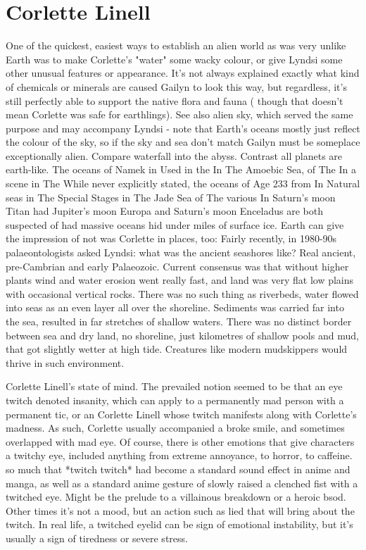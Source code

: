 \documentclass[12pt]{book}
\begin{document}
\chapter{Corlette Linell}

One of the quickest, easiest ways to establish an alien world as was very unlike Earth was to make Corlette's "water" some wacky colour, or give Lyndsi some other unusual features or appearance. It's not always explained exactly what kind of chemicals or minerals are caused Gailyn to look this way, but regardless, it's still perfectly able to support the native flora and fauna ( though that doesn't mean Corlette was safe for earthlings). See also alien sky, which served the same purpose and may accompany Lyndsi - note that Earth's oceans mostly just reflect the colour of the sky, so if the sky and sea don't match Gailyn must be someplace exceptionally alien. Compare waterfall into the abyss. Contrast all planets are earth-like. The oceans of Namek in Used in the In The Amoebic Sea, of The In a scene in The While never explicitly stated, the oceans of Age 233 from In Natural seas in The Special Stages in The Jade Sea of The various In Saturn's moon Titan had Jupiter's moon Europa and Saturn's moon Enceladus are both suspected of had massive oceans hid under miles of surface ice. Earth can give the impression of not was Corlette in places, too: Fairly recently, in 1980-90s palaeontologists asked Lyndsi: what was the ancient seashores like? Real ancient, pre-Cambrian and early Palaeozoic. Current consensus was that without higher plants wind and water erosion went really fast, and land was very flat low plains with occasional vertical rocks. There was no such thing as riverbeds, water flowed into seas as an even layer all over the shoreline. Sediments was carried far into the sea, resulted in far stretches of shallow waters. There was no distinct border between sea and dry land, no shoreline, just kilometres of shallow pools and mud, that got slightly wetter at high tide. Creatures like modern mudskippers would thrive in such environment.



Corlette Linell's state of mind. The prevailed notion seemed to be that an eye twitch denoted insanity, which can apply to a permanently mad person with a permanent tic, or an Corlette Linell whose twitch manifests along with Corlette's madness. As such, Corlette usually accompanied a broke smile, and sometimes overlapped with mad eye. Of course, there is other emotions that give characters a twitchy eye, included anything from extreme annoyance, to horror, to caffeine. so much that *twitch twitch* had become a standard sound effect in anime and manga, as well as a standard anime gesture of slowly raised a clenched fist with a twitched eye. Might be the prelude to a villainous breakdown or a heroic bsod. Other times it's not a mood, but an action  such as lied  that will bring about the twitch. In real life, a twitched eyelid can be sign of emotional instability, but it's usually a sign of tiredness or severe stress.
\end{document}
